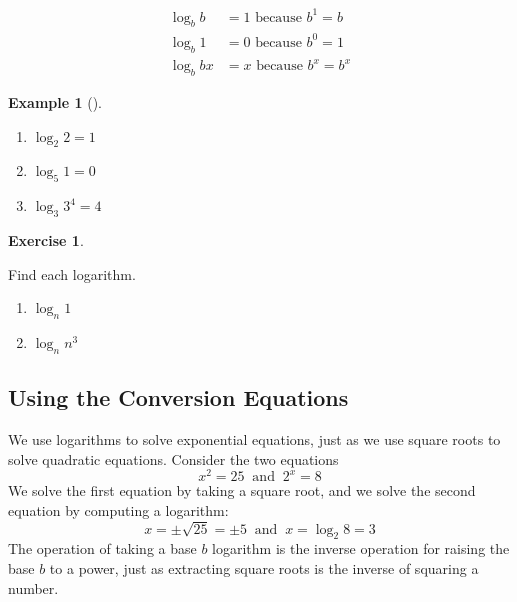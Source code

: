 \documentclass[10pt,]{book}
\theoremstyle{plain}
\theoremstyle{definition}
\theoremstyle{definition}
\newtheorem{example}[theorem]{Example}
\theoremstyle{definition}
\newtheorem{exercise}[theorem]{Exercise}
\newcommand{\amp}{ & }
\begin{document}
	\begin{align*}
	\log_b b \amp = 1 \text{ because } b^1 = b \\
	\log_b 1 \amp = 0  \text{ because } b^0 = 1 \\
	\log_b{bx} \amp = x \text{ because } b^x = b^x
	\end{align*}
%
\begin{example}[]\label{example-useful-logarithms}
\leavevmode%
\begin{enumerate}[label=*\alph**]
\item\hypertarget{li-11}{}\(\log_{2}{2} = 1\)\item\hypertarget{li-12}{}\(\log_{5}{1} = 0\)\item\hypertarget{li-13}{}\(\log_{3}{3^4} = 4\)\end{enumerate}
\end{example}
\begin{exercise}\label{exercise-useful-logarithms}

	Find each logarithm.
	\leavevmode%
\begin{enumerate}[label=*\alph**]
\item\hypertarget{li-14}{}\(\log_{n}{1}\)\item\hypertarget{li-15}{}\(\log_{n}{n^3}\)\end{enumerate}
\end{exercise}
\typeout{************************************************}
\typeout{************************************************}
\subsection[Using the Conversion Equations]{Using the Conversion Equations}\label{subsection-1}

	We use logarithms to solve exponential equations, just as we use square roots to solve quadratic equations. Consider the two equations
	\begin{equation*}x^2 = 25 ~ \text{ and } ~ 2^x = 8\end{equation*}
	We solve the first equation by taking a square root, and we solve the second equation by computing a logarithm:
	\begin{equation*}x = \pm\sqrt{25} = \pm 5 ~ \text{ and } ~ x = \log_{2}{8} = 3\end{equation*}
	The operation of taking a base \(b\) logarithm is the inverse operation for raising the base \(b\) to a power, just as extracting square roots is the inverse of squaring a number.
%
\par
\end{document}
